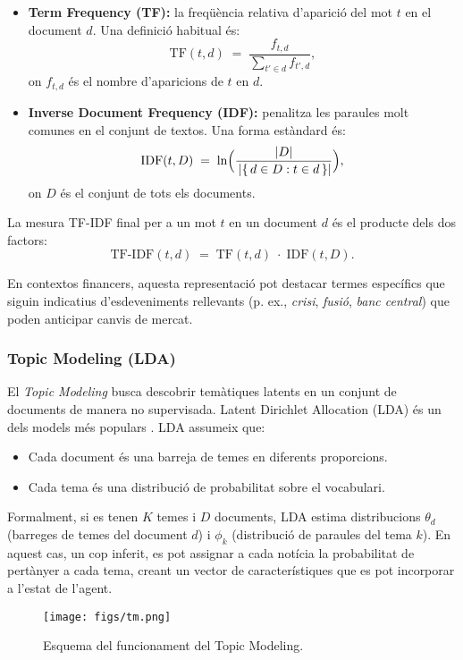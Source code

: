 \documentclass[12pt,a4paper,twoside]{book}
\begin{document}
\begin{itemize}
\item \textbf{Term Frequency (TF):} la freqüència relativa d'aparició del mot $t$ en el document $d$. Una definició habitual és:
\[
\mathrm{TF}(t,d) \;=\; \frac{f_{t,d}}{\sum_{t' \in d} f_{t',d}},
\]
on $f_{t,d}$ és el nombre d'aparicions de $t$ en $d$.
\item \textbf{Inverse Document Frequency (IDF):} penalitza les paraules molt comunes en el conjunt de textos. Una forma estàndard és:
\[
\mathrm{IDF}(t,D) \;=\; \ln \Bigl(\frac{|D|}{\,|\{\,d \in D : t \in d\,\}|}\Bigr),
\]
on $D$ és el conjunt de tots els documents.
\end{itemize}

La mesura TF-IDF final per a un mot $t$ en un document $d$ és el producte dels dos factors:
\[
\mathrm{TF\text{-}IDF}(t,d) \;=\; \mathrm{TF}(t,d)\;\cdot\;\mathrm{IDF}(t,D).
\]

En contextos financers, aquesta representació pot destacar termes específics que siguin indicatius d'esdeveniments rellevants (p. ex., \emph{crisi}, \emph{fusió}, \emph{banc central}) que poden anticipar canvis de mercat.

\subsubsection{Topic Modeling (LDA)}

El \emph{Topic Modeling} busca descobrir temàtiques latents en un conjunt de documents de manera no supervisada. Latent Dirichlet Allocation (LDA) és un dels models més populars \cite{Blei2003}. LDA assumeix que:

\begin{itemize}
\item Cada document és una barreja de temes en diferents proporcions.
\item Cada tema és una distribució de probabilitat sobre el vocabulari.
\end{itemize}

Formalment, si es tenen $K$ temes i $D$ documents, LDA estima distribucions $\theta_d$ (barreges de temes del document $d$) i $\phi_k$ (distribució de paraules del tema $k$). En aquest cas, un cop inferit, es pot assignar a cada notícia la probabilitat de pertànyer a cada tema, creant un vector de característiques que es pot incorporar a l'estat de l'agent.

\begin{figure}[H]
	\centering
	\texttt{[image: figs/tm.png]}
	\caption{Esquema del funcionament del Topic Modeling\cite{esquemaRL}.}
	\label{fig:context-anoni1}
\end{figure}
\end{document}

